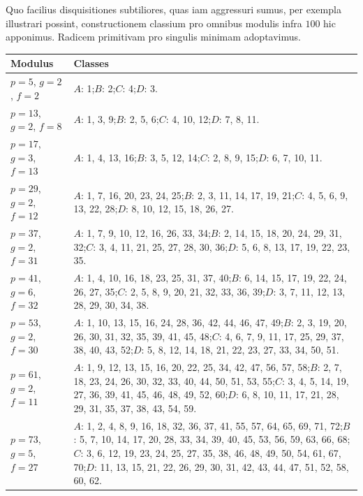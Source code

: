 \documentclass[12pt]{article}
\begin{document}
Quo facilius disquisitiones subtiliores, quas iam aggressuri sumus, per exempla illustrari possint, constructionem classium pro omnibus modulis infra $100$ hic apponimus. Radicem primitivam pro singulis minimam adoptavimus.

\begin{longtable}{>{\raggedright\arraybackslash}p{}p{}}
\toprule
Modulus & Classes\\
\midrule
$p=5$, $g=2$, $f=2$ &
$A$: 1;\quad $B$: 2;\quad $C$: 4;\quad $D$: 3.\\[2pt]
$p=13$, $g=2$, $f=8$ &
$A$: 1, 3, 9;\quad $B$: 2, 5, 6;\quad $C$: 4, 10, 12;\quad $D$: 7, 8, 11.\\[2pt]
$p=17$, $g=3$, $f=13$ &
$A$: 1, 4, 13, 16;\quad $B$: 3, 5, 12, 14;\quad $C$: 2, 8, 9, 15;\quad $D$: 6, 7, 10, 11.\\[2pt]
$p=29$, $g=2$, $f=12$ &
$A$: 1, 7, 16, 20, 23, 24, 25;\quad $B$: 2, 3, 11, 14, 17, 19, 21;\quad $C$: 4, 5, 6, 9, 13, 22, 28;\quad $D$: 8, 10, 12, 15, 18, 26, 27.\\[2pt]
$p=37$, $g=2$, $f=31$ &
$A$: 1, 7, 9, 10, 12, 16, 26, 33, 34;\quad $B$: 2, 14, 15, 18, 20, 24, 29, 31, 32;\quad $C$: 3, 4, 11, 21, 25, 27, 28, 30, 36;\quad $D$: 5, 6, 8, 13, 17, 19, 22, 23, 35.\\[2pt]
$p=41$, $g=6$, $f=32$ &
$A$: 1, 4, 10, 16, 18, 23, 25, 31, 37, 40;\quad $B$: 6, 14, 15, 17, 19, 22, 24, 26, 27, 35;\quad $C$: 2, 5, 8, 9, 20, 21, 32, 33, 36, 39;\quad $D$: 3, 7, 11, 12, 13, 28, 29, 30, 34, 38.\\[2pt]
$p=53$, $g=2$, $f=30$ &
$A$: 1, 10, 13, 15, 16, 24, 28, 36, 42, 44, 46, 47, 49;\quad $B$: 2, 3, 19, 20, 26, 30, 31, 32, 35, 39, 41, 45, 48;\quad $C$: 4, 6, 7, 9, 11, 17, 25, 29, 37, 38, 40, 43, 52;\quad $D$: 5, 8, 12, 14, 18, 21, 22, 23, 27, 33, 34, 50, 51.\\[2pt]
$p=61$, $g=2$, $f=11$ &
$A$: 1, 9, 12, 13, 15, 16, 20, 22, 25, 34, 42, 47, 56, 57, 58;\quad $B$: 2, 7, 18, 23, 24, 26, 30, 32, 33, 40, 44, 50, 51, 53, 55;\quad $C$: 3, 4, 5, 14, 19, 27, 36, 39, 41, 45, 46, 48, 49, 52, 60;\quad $D$: 6, 8, 10, 11, 17, 21, 28, 29, 31, 35, 37, 38, 43, 54, 59.\\[2pt]
$p=73$, $g=5$, $f=27$ &
$A$: 1, 2, 4, 8, 9, 16, 18, 32, 36, 37, 41, 55, 57, 64, 65, 69, 71, 72;\quad $B$: 5, 7, 10, 14, 17, 20, 28, 33, 34, 39, 40, 45, 53, 56, 59, 63, 66, 68;\quad $C$: 3, 6, 12, 19, 23, 24, 25, 27, 35, 38, 46, 48, 49, 50, 54, 61, 67, 70;\quad $D$: 11, 13, 15, 21, 22, 26, 29, 30, 31, 42, 43, 44, 47, 51, 52, 58, 60, 62.\\[2pt]

\end{longtable}
\end{document}
